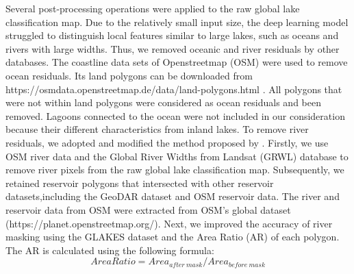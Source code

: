 \documentclass[preprint,12pt,authoryear]{elsarticle}
\begin{document}
Several post-processing operations were applied to the raw global lake classification map. Due to the relatively small input size, the deep learning model struggled to distinguish local features similar to large lakes, such as oceans and rivers with large widths. Thus, we removed oceanic and river residuals by other databases. The coastline data sets of Openstreetmap (OSM) \citep{goodchild_citizens_2007} were used to remove ocean residuals. Its land polygons can be downloaded from https://osmdata.openstreetmap.de/data/land-polygons.html . All polygons that were not within land polygons were considered as ocean residuals and been removed. Lagoons connected to the ocean were not included in our consideration because their different characteristics from inland lakes. To remove river residuals, we adopted and modified the method proposed by \citet{pi_mapping_2022}. Firstly, we use OSM river data and the Global River Widths from Landsat (GRWL)\citep{allen_global_2018} database to remove river pixels from the raw global lake classification map. Subsequently, we retained reservoir polygons that intersected with other reservoir datasets,including the GeoDAR dataset \citep{wang_surface_2025} and OSM reservoir data. The river and reservoir data from OSM were extracted from OSM's global dataset (https://planet.openstreetmap.org/). Next, we improved the accuracy of river masking using the GLAKES dataset and the Area Ratio (AR) of each polygon. The AR is calculated using the following formula:
\begin{equation}
Area Ratio = Area_{after\ mask}/Area_{before\ mask}
\end{equation}
\end{document}
